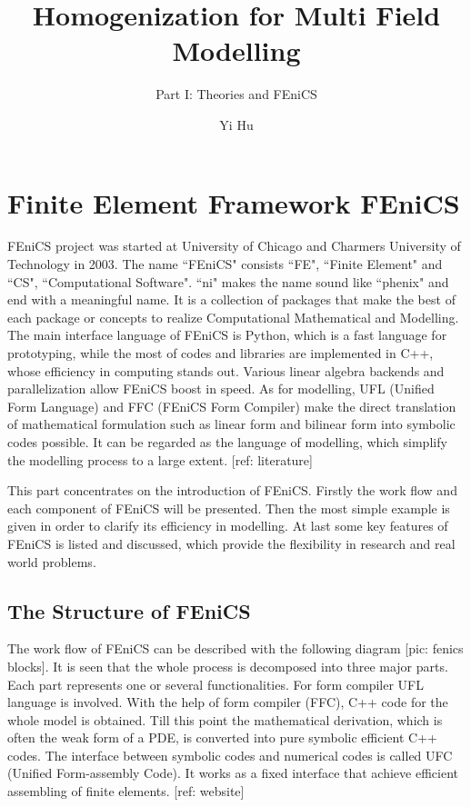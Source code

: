 \documentclass[10pt,a4paper]{scrreprt}
\author{Yi Hu}
\title{Homogenization for Multi Field Modelling}
\subtitle{Part I: Theories and FEniCS}
\begin{document}
\chapter{Finite Element Framework FEniCS}

FEniCS project was started at University of Chicago and Charmers University of Technology in 2003. The name ``FEniCS" consists ``FE", ``Finite Element" and ``CS", ``Computational Software". ``ni" makes the name sound like ``phenix" and end with a meaningful name. It is a collection of packages that make the best of each package or concepts to realize Computational Mathematical and Modelling. The main interface language of FEniCS is Python, which is a fast language for prototyping, while the most of codes and libraries are implemented in C++, whose efficiency in computing stands out. Various linear algebra backends and parallelization allow FEniCS boost in speed. As for modelling, UFL (Unified Form Language) and FFC (FEniCS Form Compiler) make the direct translation of mathematical formulation such as linear form and bilinear form into symbolic codes possible. It can be regarded as the language of modelling, which simplify the modelling process to a large extent. [ref: literature]

This part concentrates on the introduction of FEniCS. Firstly the work flow and each component of FEniCS will be presented. Then the most simple example is given in order to clarify its efficiency in modelling. At last some key features of FEniCS is listed and discussed, which provide the flexibility in research and real world problems.

\section{The Structure of FEniCS}
The work flow of FEniCS can be described with the following diagram [pic: fenics blocks]. It is seen that the whole process is decomposed into three major parts. Each part represents one or several functionalities. For form compiler UFL language is involved. With the help of form compiler (FFC), C++ code for the whole model is obtained. Till this point the mathematical derivation, which is often the weak form of a PDE, is converted into pure symbolic efficient C++ codes. The interface between symbolic codes and numerical codes is called UFC (Unified Form-assembly Code). It works as a fixed interface that achieve efficient assembling of finite elements. [ref: website]
\end{document}
